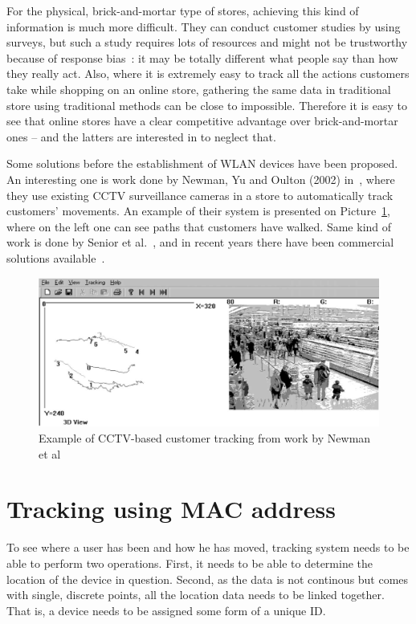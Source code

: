\documentclass[12pt,a4paper,oneside,pdftex]{report}
\begin{document}
For the physical, brick-and-mortar type of stores, achieving this kind of information is much more difficult. They can conduct customer studies by using surveys, but such a study requires lots of resources and might not be trustworthy because of response bias~\cite{Furnham1986385}: it may be totally different what people say than how they really act. Also, where it is extremely easy to track all the actions customers take while shopping on an online store, gathering the same data in traditional store using traditional methods can be close to impossible. Therefore it is easy to see that online stores have a clear competitive advantage over brick-and-mortar ones -- and the latters are interested in to neglect that.

Some solutions before the establishment of WLAN devices have been proposed. An interesting one is work done by Newman, Yu and Oulton (2002) in~\cite{Newman2002253}, where they use existing CCTV surveillance cameras in a store to automatically track customers' movements. An example of their system is presented on Picture~\ref{fig:cctv_tracking}, where on the left one can see paths that customers have walked. Same kind of work is done by Senior et al.~\cite{senior2007video}, and in recent years there have been commercial solutions available~\cite{retailcctv}.

\begin{figure}
    \label{fig:cctv_tracking}
    \includegraphics[width=\textwidth]{images/cctv_tracking_newman_pic1}
    \caption{Example of CCTV-based customer tracking from work by Newman et al~\cite{Newman2002253}}
\end{figure}


\section{Tracking using MAC address}
\label{sec:mac_tracking}

To see where a user has been and how he has moved, tracking system needs to be able to perform two operations. First, it needs to be able to determine the location of the device in question. Second, as the data is not continous but comes with single, discrete points, all the location data needs to be linked together. That is, a device needs to be assigned some form of a unique ID.
\end{document}
